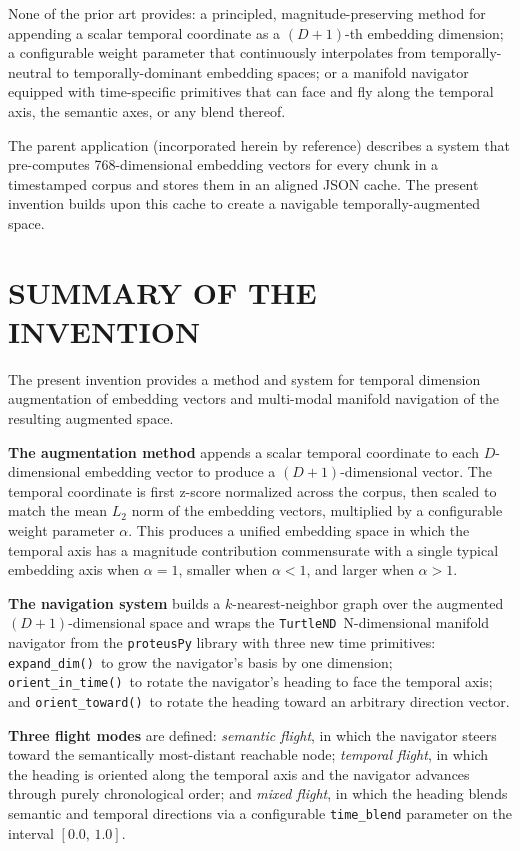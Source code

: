 \documentclass[12pt,letterpaper]{article}
\newcommand{\turtlend}{\texttt{TurtleND}}
\newcommand{\expanddim}{\texttt{expand\_dim()}}
\newcommand{\orientintime}{\texttt{orient\_in\_time()}}
\newcommand{\orienttoward}{\texttt{orient\_toward()}}
\newcommand{\alphabar}{$\alpha$}
\begin{document}
None of the prior art provides: a principled, magnitude-preserving method for
appending a scalar temporal coordinate as a $(D+1)$-th embedding dimension; a
configurable weight parameter that continuously interpolates from
temporally-neutral to temporally-dominant embedding spaces; or a manifold
navigator equipped with time-specific primitives that can face and fly along the
temporal axis, the semantic axes, or any blend thereof.

The parent application (incorporated herein by reference) describes a system
that pre-computes 768-dimensional embedding vectors for every chunk in a
timestamped corpus and stores them in an aligned JSON cache. The present
invention builds upon this cache to create a navigable temporally-augmented
space.

\section*{SUMMARY OF THE INVENTION}

The present invention provides a method and system for temporal dimension
augmentation of embedding vectors and multi-modal manifold navigation of the
resulting augmented space.

\textbf{The augmentation method} appends a scalar temporal coordinate to each
$D$-dimensional embedding vector to produce a $(D+1)$-dimensional vector. The
temporal coordinate is first z-score normalized across the corpus, then scaled
to match the mean $L_2$ norm of the embedding vectors, multiplied by a
configurable weight parameter \alphabar. This produces a unified embedding space
in which the temporal axis has a magnitude contribution commensurate with a
single typical embedding axis when $\alpha = 1$, smaller when $\alpha < 1$, and
larger when $\alpha > 1$.

\textbf{The navigation system} builds a $k$-nearest-neighbor graph over the
augmented $(D+1)$-dimensional space and wraps the \turtlend\ N-dimensional
manifold navigator from the \texttt{proteusPy} library with three new time
primitives: \expanddim\ to grow the navigator's basis by one dimension;
\orientintime\ to rotate the navigator's heading to face the temporal axis; and
\orienttoward\ to rotate the heading toward an arbitrary direction vector.

\textbf{Three flight modes} are defined: \emph{semantic flight}, in which the
navigator steers toward the semantically most-distant reachable node; \emph{temporal
flight}, in which the heading is oriented along the temporal axis and the
navigator advances through purely chronological order; and \emph{mixed flight},
in which the heading blends semantic and temporal directions via a configurable
\texttt{time\_blend} parameter on the interval $[0.0,\, 1.0]$.
\end{document}
